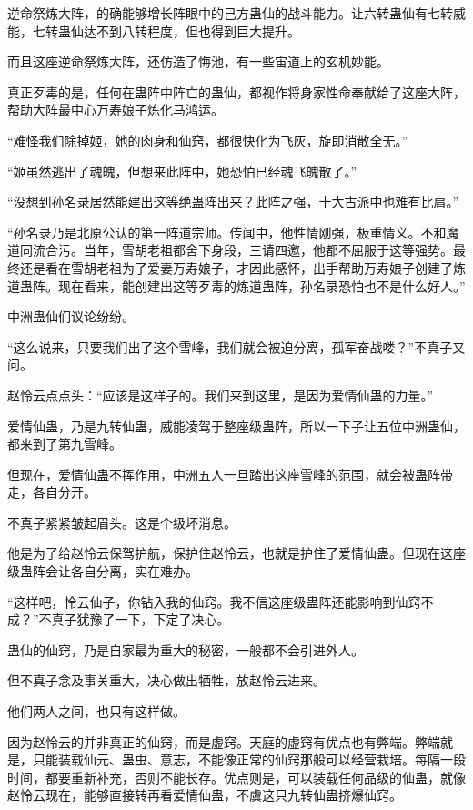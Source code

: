 \begin{this_body}
逆命祭炼大阵，的确能够增长阵眼中的己方蛊仙的战斗能力。让六转蛊仙有七转威能，七转蛊仙达不到八转程度，但也得到巨大提升。

而且这座逆命祭炼大阵，还仿造了悔池，有一些宙道上的玄机妙能。

真正歹毒的是，任何在蛊阵中阵亡的蛊仙，都视作将身家性命奉献给了这座大阵，帮助大阵最中心万寿娘子炼化马鸿运。

“难怪我们除掉姬，她的肉身和仙窍，都很快化为飞灰，旋即消散全无。”

“姬虽然逃出了魂魄，但想来此阵中，她恐怕已经魂飞魄散了。”

“没想到孙名录居然能建出这等绝蛊阵出来？此阵之强，十大古派中也难有比肩。”

“孙名录乃是北原公认的第一阵道宗师。传闻中，他性情刚强，极重情义。不和魔道同流合污。当年，雪胡老祖都舍下身段，三请四邀，他都不屈服于这等强势。最终还是看在雪胡老祖为了爱妻万寿娘子，才因此感怀，出手帮助万寿娘子创建了炼道蛊阵。现在看来，能创建出这等歹毒的炼道蛊阵，孙名录恐怕也不是什么好人。”

中洲蛊仙们议论纷纷。

“这么说来，只要我们出了这个雪峰，我们就会被迫分离，孤军奋战喽？”不真子又问。

赵怜云点点头：“应该是这样子的。我们来到这里，是因为爱情仙蛊的力量。”

爱情仙蛊，乃是九转仙蛊，威能凌驾于整座级蛊阵，所以一下子让五位中洲蛊仙，都来到了第九雪峰。

但现在，爱情仙蛊不挥作用，中洲五人一旦踏出这座雪峰的范围，就会被蛊阵带走，各自分开。

不真子紧紧皱起眉头。这是个级坏消息。

他是为了给赵怜云保驾护航，保护住赵怜云，也就是护住了爱情仙蛊。但现在这座级蛊阵会让各自分离，实在难办。

“这样吧，怜云仙子，你钻入我的仙窍。我不信这座级蛊阵还能影响到仙窍不成？”不真子犹豫了一下，下定了决心。

蛊仙的仙窍，乃是自家最为重大的秘密，一般都不会引进外人。

但不真子念及事关重大，决心做出牺牲，放赵怜云进来。

他们两人之间，也只有这样做。

因为赵怜云的并非真正的仙窍，而是虚窍。天庭的虚窍有优点也有弊端。弊端就是，只能装载仙元、蛊虫、意志，不能像正常的仙窍那般可以经营栽培。每隔一段时间，都要重新补充，否则不能长存。优点则是，可以装载任何品级的仙蛊，就像赵怜云现在，能够直接转再看爱情仙蛊，不虞这只九转仙蛊挤爆仙窍。


\end{this_body}
